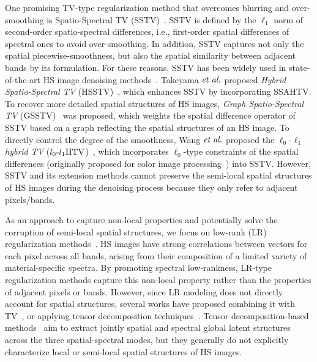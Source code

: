 One promising TV-type regularization method that overcomes blurring and over-smoothing is Spatio-Spectral TV (SSTV)~\cite{Aggarwal2016SSTV}.
SSTV is defined by the $\ell_{1}$ norm of second-order spatio-spectral differences, i.e., first-order spatial differences of spectral ones to avoid over-smoothing.
In addition, SSTV captures not only the spatial piecewise-smoothness, but also the spatial similarity between adjacent bands by its formulation.
For these reasons, SSTV has been widely used in state-of-the-art HS image denoising methods~\cite{Fan2018SSTV-LRTF,Ince2019GLSSTV,Takeyama2020HSSTV,Wang2021l0l1HTV,Takemoto2022GSSTV}.	
Takeyama $\textit{et al.}$ proposed \textit{Hybrid Spatio-Spectral TV} (HSSTV)~\cite{Takeyama2020HSSTV}, which enhances SSTV by incorporating SSAHTV.
To recover more detailed spatial structures of HS images, \textit{Graph Spatio-Spectral TV} (GSSTV)~\cite{Takemoto2022GSSTV} was proposed, which weights the spatial difference operator of SSTV based on a graph reflecting the spatial structures of an HS image.
To directly control the degree of the smoothness, Wang $\textit{et al.}$ proposed the $\ell_{0}\text{-}\ell_{1}$ \textit{hybrid TV} (${l_{0}\text{-}l_{1}\text{HTV}}$)~\cite{Wang2021l0l1HTV}, which incorporates $\ell_{0}$-type constraints of the spatial differences (originally proposed for color image processing~\cite{Ono2017l0Gradient}) into SSTV.
However, SSTV and its extension methods cannot preserve the semi-local spatial structures of HS images during the denoising process because they only refer to adjacent pixels/bands.


As an approach to capture non-local properties and potentially solve the corruption of semi-local spatial structures, we focus on low-rank (LR) regularization methods~\cite{Zhang2014LRMR, Chen2022FGSLR}. HS images have strong correlations between vectors for each pixel across all bands, arising from their composition of a limited variety of material-specific spectra. By promoting spectral low-rankness, LR-type regularization methods capture this non-local property rather than the properties of adjacent pixels or bands. However, since LR modeling does not directly account for spatial structures, several works have proposed combining it with TV~\cite{He2016LRTV, Chen2023TPTV}, or applying tensor decomposition techniques~\cite{Xue2022Tensor1,Xue2022Tensor2,Xue2024Tensor}. Tensor decomposition-based methods~\cite{Wang2018LRTDTV, Chen2020LRTDGS, Sun2022Tensor, Li2024LRTDAHL} aim to extract jointly spatial and spectral global latent structures across the three spatial-spectral modes, but they generally do not explicitly characterize local or semi-local spatial structures of HS images.


